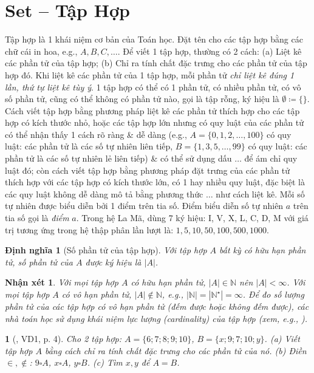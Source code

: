 \documentclass{article}
\newtheorem{baitoan}{}
\newtheorem{dinhnghia}{Định nghĩa}
\newtheorem{nhanxet}{Nhận xét}
\begin{document}
\section{Set -- Tập Hợp}
 Tập hợp là 1 khái niệm cơ bản của Toán học. Đặt tên cho các tập hợp bằng các chữ cái in hoa, e.g., $A,B,C,\ldots$.  Để viết 1 tập hợp, thường có 2 cách: (a) Liệt kê các phần tử của tập hợp; (b) Chỉ ra tính chất đặc trưng cho các phần tử của tập hợp đó.  Khi liệt kê các phần tử của 1 tập hợp, mỗi phần tử \textit{chỉ liệt kê đúng 1 lần, thứ tự liệt kê tùy ý}.  1 tập hợp có thể có 1 phần tử, có nhiều phần tử, có vô số phần tử, cũng có thể không có phần tử nào, gọi là tập rỗng, ký hiệu là $\emptyset\coloneqq\{\}$.  Cách viết tập hợp bằng phương pháp liệt kê các phần tử thích hợp cho các tập hợp có kích thước nhỏ, hoặc các tập hợp lớn nhưng có quy luật của các phần tử có thể nhận thấy 1 cách rõ ràng \& dễ dàng (e.g., $A = \{0,1,2,\ldots,100\}$ có quy luật: các phần tử là các số tự nhiên liên tiếp, $B = \{1,3,5,\ldots,99\}$ có quy luật: các phần tử là các số tự nhiên lẻ liên tiếp) \& có thể sử dụng dấu $\ldots$ để ám chỉ quy luật đó; còn cách viết tập hợp bằng phương pháp đặt trưng của các phần tử thích hợp với các tập hợp có kích thước lớn, có 1 hay nhiều quy luật, đặc biệt là các quy luật không dễ dàng mô tả bằng phương thức $\ldots$ như cách liệt kê.  Mỗi số tự nhiên được biểu diễn bởi 1 điểm trên tia số. Điểm biểu diễn số tự nhiên $a$ trên tia số gọi là \textit{điểm} $a$.  Trong hệ La Mã, dùng 7 ký hiệu: I, V, X, L, C, D, M với giá trị tương ứng trong hệ thập phân lần lượt là: $1,5,10,50,100,500,1000$.

\begin{dinhnghia}[Số phần tử của tập hợp]
	Với tập hợp $A$ bất kỳ có hữu hạn phần tử, {\rm số phần tử} của $A$ được ký hiệu là $|A|$.
\end{dinhnghia}

\begin{nhanxet}
	Với mọi tập hợp $A$ có hữu hạn phần tử, $|A|\in\mathbb{N}$ nên $|A| < \infty$. Với mọi tập hợp $A$ có vô hạn phần tử, $|A|\notin\mathbb{N}$, e.g., $|\mathbb{N}| = |\mathbb{N}^\star| =  \infty$. Để đo số lượng phần tử của các tập hợp có vô hạn phần tử (đếm được hoặc không đếm được), các nhà toán học sử dụng khái niệm {\rm lực lượng (cardinality)} của tập hợp (xem, e.g., {\rm\cite{Halmos1960, Halmos1974}}).
\end{nhanxet}

\begin{baitoan}[\cite{Tuyen_Toan_6}, VD1, p. 4]
	Cho 2 tập hợp: $A = \{6;7;8;9;10\}$, $B = \{x;9;7;10;y\}$. (a) Viết tập hợp $A$ bằng cách chỉ ra tính chất đặc trưng cho các phần tử của nó. (b) Điền $\in,\notin$: $9\square A$, $x\square A$, $y\square B$. (c) Tìm $x,y$ để $A = B$.
\end{baitoan}
\end{document}
